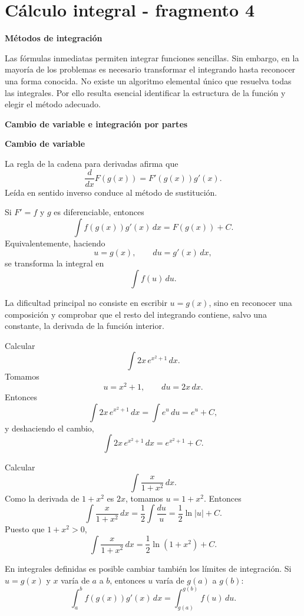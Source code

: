\section{Cálculo integral - fragmento 4}
\textbf{Métodos de integración}

Las fórmulas inmediatas permiten integrar funciones sencillas. Sin embargo, en la mayoría de los problemas es necesario transformar el integrando hasta reconocer una forma conocida. No existe un algoritmo elemental único que resuelva todas las integrales. Por ello resulta esencial identificar la estructura de la función y elegir el método adecuado.

\textbf{Cambio de variable e integración por partes}

\textbf{Cambio de variable}

La regla de la cadena para derivadas afirma que
\[
\frac{d}{dx}F(g(x))=F'(g(x))g'(x).
\]
Leída en sentido inverso conduce al método de sustitución.

\begin{theorem}
Si $F'=f$ y $g$ es diferenciable, entonces
\[
\int f(g(x))g'(x)\,dx=F(g(x))+C.
\]
Equivalentemente, haciendo
\[
u=g(x),\qquad du=g'(x)\,dx,
\]
se transforma la integral en
\[
\int f(u)\,du.
\]
\end{theorem}

La dificultad principal no consiste en escribir $u=g(x)$, sino en reconocer una composición y comprobar que el resto del integrando contiene, salvo una constante, la derivada de la función interior.

\begin{example}
Calcular
\[
\int 2x\,e^{x^2+1}\,dx.
\]
Tomamos
\[
u=x^2+1,
\qquad du=2x\,dx.
\]
Entonces
\[
\int 2x\,e^{x^2+1}\,dx
=
\int e^u\,du
=e^u+C,
\]
y deshaciendo el cambio,
\[
\boxed{\int 2x\,e^{x^2+1}\,dx=e^{x^2+1}+C.}
\]
\end{example}

\begin{example}
Calcular
\[
\int \frac{x}{1+x^2}\,dx.
\]
Como la derivada de $1+x^2$ es $2x$, tomamos $u=1+x^2$. Entonces
\[
\int \frac{x}{1+x^2}\,dx
=
\frac12\int\frac{du}{u}
=
\frac12\ln|u|+C.
\]
Puesto que $1+x^2>0$,
\[
\boxed{\int \frac{x}{1+x^2}\,dx=\frac12\ln(1+x^2)+C.}
\]
\end{example}

En integrales definidas es posible cambiar también los límites de integración. Si $u=g(x)$ y $x$ varía de $a$ a $b$, entonces $u$ varía de $g(a)$ a $g(b)$:
\[
\int_a^b f(g(x))g'(x)\,dx
=
\int_{g(a)}^{g(b)}f(u)\,du.
\]


